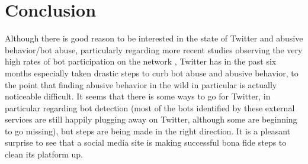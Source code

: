 \documentclass[11pt]{article}
\begin{document}
\section{Conclusion}
\label{conclusion}
Although there is good reason to be interested in the state of Twitter and abusive behavior/bot abuse, particularly regarding more recent studies observing the very high rates of bot participation on the network \cite{bots-twittersphere}, Twitter has in the past six months especially taken drastic steps to curb bot abuse and abusive behavior, to the point that finding abusive behavior in the wild in particular is actually noticeable difficult. It seems that there is some ways to go for Twitter, in particular regarding bot detection (most of the bots identified by these external services are still happily plugging away on Twitter, although some are beginning to go missing), but steps are being made in the right direction. It is a pleasant surprise to see that a social media site is making successful bona fide steps to clean its platform up.



\end{document}
